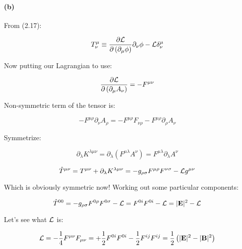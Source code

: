 \documentclass[11pt]{article}
\begin{document}
\pagebreak

\paragraph*{(b)}

From (2.17):

\begin{equation}
T^\mu_\nu \equiv
  \frac{\partial {\cal{L}}}{\partial \left( \partial_\mu \phi \right) } \partial_\nu \phi -
  {\cal{L}} \delta^\mu_\nu
\end{equation}

Now putting our Lagrangian to use:

\begin{equation}
\frac{\partial {\cal{L}}}{\partial \left( \partial_\mu A_\nu \right) } =
  -F^{\mu\nu}
\end{equation}

Non-symmetric term of the tensor is:

\begin{equation}
-F^{\mu \rho} \partial_\nu A_\rho =
  -F^{\mu \rho} F_{\nu \rho} - F^{\mu \rho} \partial_\rho A_\nu 
\end{equation}

Symmetrize:

\begin{equation}
\partial_\lambda K^{\lambda \mu \nu} =
  \partial_\lambda \left( F^{\mu \lambda} A^\nu \right) =
  F^{\mu \lambda} \partial_\lambda A^\nu
\end{equation}

\begin{equation}
\hat{T}^{\mu \nu} = T^{\mu\nu} + \partial_\lambda K^{\lambda \mu \nu}
  = - g_{\rho \sigma} F^{\mu \rho} F^{\nu \sigma} -
    {\cal{L}} g^{\mu\nu}
\end{equation}

Which is obviously symmetric now! Working out some particular
components:

\begin{equation}
\hat{T}^{00} = -g_{\rho \sigma} F^{0\rho} F^{0\sigma} - {\cal{L}} =
  F^{0i} F^{0i} - {\cal{L}} = |\mathbf{E}|^2 - {\cal{L}}
\end{equation}

Let's see what ${\cal{L}}$ is:

\begin{equation}
{\cal{L}} = -\frac{1}{4} F^{\mu\nu} F_{\mu\nu} =
  +\frac{1}{2} F^{0i} F^{0i} - \frac{1}{2} F^{ij} F^{ij} =
  \frac{1}{2} \left( |\mathbf{E}|^2 - |\mathbf{B}|^2 \right)
\end{equation}
\end{document}
